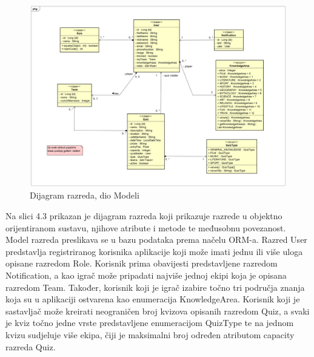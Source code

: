 			\begin{figure}[H]
				\includegraphics[width=\textwidth]{dijagrami/classDiagram1.PNG} 
				\caption{Dijagram razreda, dio Modeli}
				\label{fig:classDiagram1}
			\end{figure}
		
			Na slici 4.3 prikazan je dijagram razreda koji prikazuje razrede u objektno orijentiranom sustavu, njihove atribute i metode te međusobnu povezanost. Model razreda preslikava se u bazu podataka prema načelu ORM-a. Razred User predstavlja registriranog korisnika aplikacije koji može imati jednu ili više uloga opisane razredom Role. Korisnik prima obavijesti predstavljene razredom Notification, a kao igrač može pripadati najviše jednoj ekipi koja je opisana razredom Team. Također, korisnik koji je igrač izabire točno tri područja znanja koja su u aplikaciji ostvarena kao enumeracija KnowledgeArea. Korisnik koji je sastavljač može kreirati neograničen broj kvizova opisanih razredom Quiz, a svaki je kviz točno jedne vrste predstavljene enumeracijom QuizType te na jednom kvizu sudjeluje više ekipa, čiji je maksimalni broj određen atributom capacity razreda Quiz. 
			
